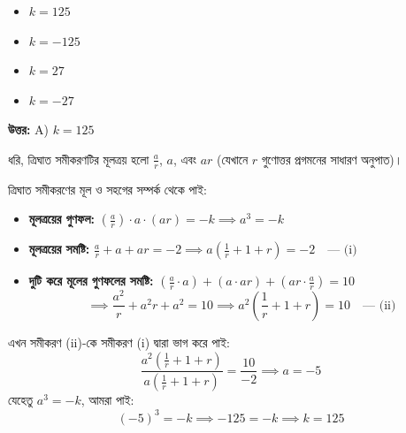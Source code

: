 \documentclass[12pt, a4paper]{article}
\begin{document}
\begin{itemize}[label={}, leftmargin=1cm, itemsep=0.5em]
    \item[\textbf{A)}] $k = 125$
    \item[\textbf{B)}] $k = -125$
    \item[\textbf{C)}] $k = 27$
    \item[\textbf{D)}] $k = -27$
\end{itemize}

\vspace{0.5em}
\begin{tcolorbox}[answerbox]
    \textbf{\color{success} উত্তর:} A) $k = 125$
\end{tcolorbox}
\vspace{1em}

\begin{tcolorbox}[solutionbox={সমাধান (Solution)}]
    \noindent
    ধরি, ত্রিঘাত সমীকরণটির মূলত্রয় হলো $\frac{a}{r}$, $a$, এবং $ar$ (যেখানে $r$ গুণোত্তর প্রগমনের সাধারণ অনুপাত)। 
    
    ত্রিঘাত সমীকরণের মূল ও সহগের সম্পর্ক থেকে পাই:
    \begin{itemize}
        \item \textbf{মূলত্রয়ের গুণফল:} $\left(\frac{a}{r}\right) \cdot a \cdot (ar) = -k \implies a^3 = -k$
        \item \textbf{মূলত্রয়ের সমষ্টি:} $\frac{a}{r} + a + ar = -2 \implies a\left(\frac{1}{r} + 1 + r\right) = -2 \quad \text{--- (i)}$
        \item \textbf{দুটি করে মূলের গুণফলের সমষ্টি:} $\left(\frac{a}{r} \cdot a\right) + (a \cdot ar) + \left(ar \cdot \frac{a}{r}\right) = 10$
        \[ \implies \frac{a^2}{r} + a^2 r + a^2 = 10 \implies a^2\left(\frac{1}{r} + 1 + r\right) = 10 \quad \text{--- (ii)} \]
    \end{itemize}
    এখন সমীকরণ (ii)-কে সমীকরণ (i) দ্বারা ভাগ করে পাই:
    \[ \frac{a^2\left(\frac{1}{r} + 1 + r\right)}{a\left(\frac{1}{r} + 1 + r\right)} = \frac{10}{-2} \implies a = -5 \]
    যেহেতু $a^3 = -k$, আমরা পাই:
    \[ (-5)^3 = -k \implies -125 = -k \implies k = 125 \]
\end{tcolorbox}

\vspace{1em}
\end{document}

